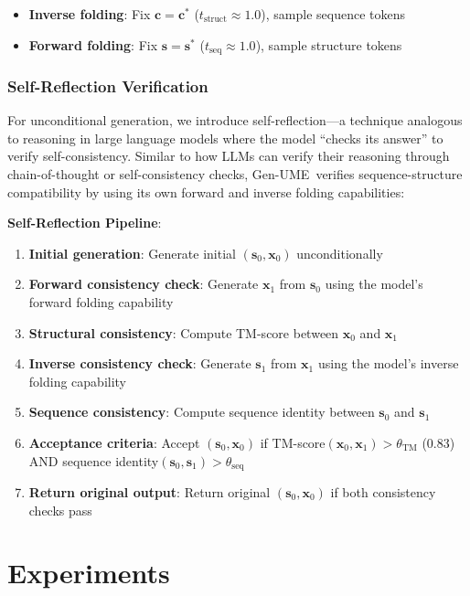 \documentclass[11pt,a4paper]{article}
\newcommand{\genume}{Gen-UME}
\begin{document}
\begin{itemize}
\item \textbf{Inverse folding}: Fix $\mathbf{c} = \mathbf{c}^*$ ($t_{\text{struct}} \approx 1.0$), sample sequence tokens
\item \textbf{Forward folding}: Fix $\mathbf{s} = \mathbf{s}^*$ ($t_{\text{seq}} \approx 1.0$), sample structure tokens
\end{itemize}

\subsubsection{Self-Reflection Verification}

For unconditional generation, we introduce self-reflection---a technique analogous to reasoning in large language models where the model ``checks its answer'' to verify self-consistency. Similar to how LLMs can verify their reasoning through chain-of-thought or self-consistency checks, \genume~verifies sequence-structure compatibility by using its own forward and inverse folding capabilities:

\textbf{Self-Reflection Pipeline}:
\begin{enumerate}
\item \textbf{Initial generation}: Generate initial $(\mathbf{s}_0, \mathbf{x}_0)$ unconditionally
\item \textbf{Forward consistency check}: Generate $\mathbf{x}_1$ from $\mathbf{s}_0$ using the model's forward folding capability
\item \textbf{Structural consistency}: Compute TM-score between $\mathbf{x}_0$ and $\mathbf{x}_1$
\item \textbf{Inverse consistency check}: Generate $\mathbf{s}_1$ from $\mathbf{x}_1$ using the model's inverse folding capability
\item \textbf{Sequence consistency}: Compute sequence identity between $\mathbf{s}_0$ and $\mathbf{s}_1$
\item \textbf{Acceptance criteria}: Accept $(\mathbf{s}_0, \mathbf{x}_0)$ if TM-score$(\mathbf{x}_0, \mathbf{x}_1) > \theta_{\text{TM}}$ (0.83) AND sequence identity$(\mathbf{s}_0, \mathbf{s}_1) > \theta_{\text{seq}}$
\item \textbf{Return original output}: Return original $(\mathbf{s}_0, \mathbf{x}_0)$ if both consistency checks pass
\end{enumerate}

\section{Experiments}
\end{document}
